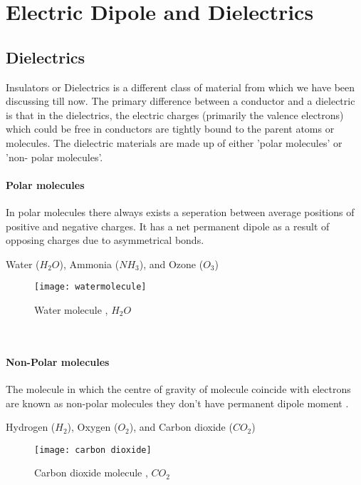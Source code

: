 \chapter{Electric Dipole  and Dielectrics}


\section{Dielectrics}
Insulators or Dielectrics is a different class of material from which we have been discussing till now. The primary difference between a conductor and a dielectric is that in the dielectrics, the electric charges (primarily the valence electrons)   which could be free in conductors are tightly bound to the parent atoms or molecules. The dielectric materials are made up of either 'polar molecules' or 'non- polar molecules'.\\
\begin{minipage}{0.60\textwidth}
	\subsubsection{Polar molecules}
	In polar molecules there always exists a seperation between average positions of positive and negative charges. It has a net permanent dipole as a result of opposing charges due to asymmetrical bonds.
	\begin{example}
		Water ($ H_{2}O $), Ammonia ($ NH_{3} $), and Ozone ($ O_{3} $)
	\end{example}  
\end{minipage}\hfil
\begin{minipage}{0.30\textwidth}
	\begin{figure}[H]
		\centering
		\texttt{[image: watermolecule]}
		\caption{ Water molecule , $H_{2}O$}
		\label{}
	\end{figure}
\end{minipage}\\
\begin{minipage}{0.60\textwidth}
	\subsubsection{Non-Polar molecules}
	The molecule in which the centre of gravity of molecule coincide  with electrons are known as non-polar molecules they don't have permanent dipole moment .
	\begin{example}
		Hydrogen ($ H_{2} $), Oxygen ($ O_{2} $), and Carbon dioxide ($ CO_{2} $)
	\end{example} 
\end{minipage}\hfil
\begin{minipage}{0.30\textwidth}
	\begin{figure}[H]
		\centering
		\texttt{[image: carbon dioxide]}
		\caption{Carbon dioxide molecule , $CO_{2}$}
		\label{}
	\end{figure}
\end{minipage}
